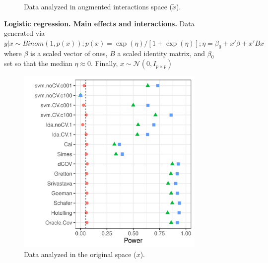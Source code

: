 \documentclass[]{bio}
\begin{document}
\begin{figure}[th]
\begin{subfigure}[t]{.45\columnwidth}
		\caption{Data analyzed in augmented interactions space ($\tilde x$).}
		\label{fig:interactions-in-augmented-space}
	\end{subfigure}
	\caption{\textbf{
		Logistic regression. Main effects and interactions.} 
		Data generated via $y|x \sim Binom(1,p(x));
		p(x)=\exp(\eta)/[1+\exp(\eta)];
		\eta=\beta_0 + x'\beta + x'Bx$ where 
		$\beta$ is a scaled vector of ones, 
		$B$ a scaled identity matrix, and $\beta_0$ set so that the median $\eta \approx0$.
		Finally, $x\sim \mathcal{N}(0,I_{p\times p})$ } 
	\label{fig:logistic-main-and-interactions}
\end{figure}





\begin{figure}[th]
	\centering
	\begin{subfigure}[t]{.45\columnwidth}
		\centering
		\includegraphics[width=1\columnwidth]{"art/file40"}
		\caption{Data analyzed in the original space ($x$).}
		\label{fig:main-only-original-space}
	\end{subfigure}
	\begin{subfigure}[t]{.45\columnwidth}
		\centering

\end{subfigure}
\end{figure}
\end{document}
